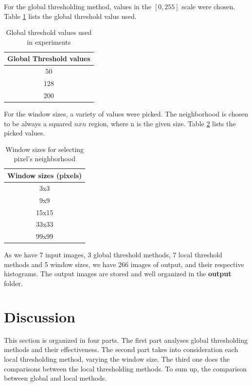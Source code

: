\documentclass[]{IEEEtran}
\begin{document}
For the global thresholding method, values in the $[0,255]$ scale were chosen. Table \ref{table:globalth} lists the global threshold valus used.

\begin{table}[h!]
  \centering
  \begin{center}
  \begin{tabular}{ |c| } 
   \hline
   Global Threshold values \\
   \hline
      50\\ 
   \hline
      128\\
   \hline
      200\\
    \hline
  \end{tabular}
  \caption{Global threshold values used in experiments}
  \label{table:globalth}
  \end{center}
  \end{table}

For the window sizes, a variety of values were picked. The neighborhood is chosen to be always a squared $nxn$ region, where n is the given size.
Table \ref{table:windows} lists the picked values.

\begin{table}[h!]
  \centering
  \begin{center}
  \begin{tabular}{ |c| } 
   \hline
   Window sizes (pixels)\\
   \hline
      3x3\\ 
   \hline
      9x9\\
   \hline
      15x15\\
    \hline
    33x33\\
    \hline
    99x99\\
    \hline
  \end{tabular}
  \caption{Window sizes for selecting pixel's neighborhood}
  \label{table:windows}
  \end{center}
  \end{table}

As we have 7 input images, 3 global threshold methods, 7 local threshold methods and 5 window sizes, we have 266 images of output, and their respective histograms. The output images are stored and well organized in the \textbf{output} folder.

\section{Discussion}
This section is organized in four parts. The first part analyses global thresholding methods and their effectiveness. The second part takes into consideration each local thresholding method, varying the window size. The third one does the comparisons between the local thresholding methods. To sum up, the comparison between global and local methods.
\end{document}
